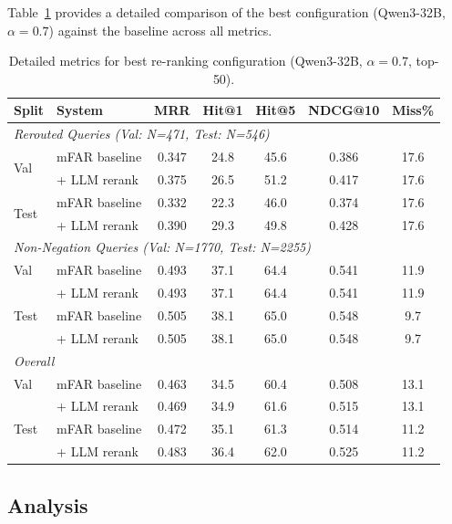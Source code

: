Table~\ref{tab:best_detail} provides a detailed comparison of the best configuration (Qwen3-32B, $\alpha=0.7$) against the baseline across all metrics.

\begin{table}[h]
\centering
\caption{Detailed metrics for best re-ranking configuration (Qwen3-32B, $\alpha=0.7$, top-50).}
\label{tab:best_detail}
\begin{tabular}{llccccc}
\toprule
\textbf{Split} & \textbf{System} & \textbf{MRR} & \textbf{Hit@1} & \textbf{Hit@5} & \textbf{NDCG@10} & \textbf{Miss\%} \\
\midrule
\multicolumn{7}{l}{\textit{Rerouted Queries (Val: N=471, Test: N=546)}} \\
\midrule
\multirow{2}{*}{Val}
 & mFAR baseline & 0.347 & 24.8 & 45.6 & 0.386 & 17.6 \\
 & + LLM rerank  & 0.375 & 26.5 & 51.2 & 0.417 & 17.6 \\
\midrule
\multirow{2}{*}{Test}
 & mFAR baseline & 0.332 & 22.3 & 46.0 & 0.374 & 17.6 \\
 & + LLM rerank  & 0.390 & 29.3 & 49.8 & 0.428 & 17.6 \\
\midrule
\multicolumn{7}{l}{\textit{Non-Negation Queries (Val: N=1770, Test: N=2255)}} \\
\midrule
Val  & mFAR baseline & 0.493 & 37.1 & 64.4 & 0.541 & 11.9 \\
     & + LLM rerank  & 0.493 & 37.1 & 64.4 & 0.541 & 11.9 \\
\midrule
Test & mFAR baseline & 0.505 & 38.1 & 65.0 & 0.548 &  9.7 \\
     & + LLM rerank  & 0.505 & 38.1 & 65.0 & 0.548 &  9.7 \\
\midrule
\multicolumn{7}{l}{\textit{Overall}} \\
\midrule
Val  & mFAR baseline & 0.463 & 34.5 & 60.4 & 0.508 & 13.1 \\
     & + LLM rerank  & 0.469 & 34.9 & 61.6 & 0.515 & 13.1 \\
\midrule
Test & mFAR baseline & 0.472 & 35.1 & 61.3 & 0.514 & 11.2 \\
     & + LLM rerank  & 0.483 & 36.4 & 62.0 & 0.525 & 11.2 \\
\bottomrule
\end{tabular}
\end{table}

\subsection{Analysis}

